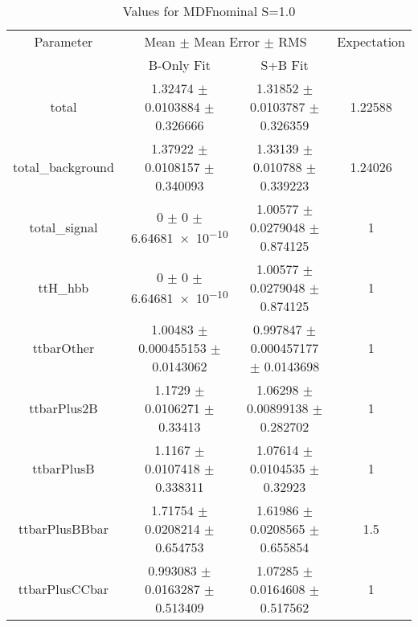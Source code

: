 \begin{table}
\centering
\caption{Values for MDFnominal S=1.0}
\begin{tabular}{cccc}
\toprule
Parameter & \multicolumn{2}{c}{Mean $\pm$ Mean Error $\pm$ RMS} & Expectation\\
 & B-Only Fit & S+B Fit & \\
\midrule
total & \num{1.32474} $\pm$ \num{0.0103884} $\pm$ \num{0.326666} & \num{1.31852} $\pm$ \num{0.0103787} $\pm$ \num{0.326359} & \num{1.22588}\\
total\_background & \num{1.37922} $\pm$ \num{0.0108157} $\pm$ \num{0.340093} & \num{1.33139} $\pm$ \num{0.010788} $\pm$ \num{0.339223} & \num{1.24026}\\
total\_signal & \num{0} $\pm$ \num{0} $\pm$ \num{6.64681e-10} & \num{1.00577} $\pm$ \num{0.0279048} $\pm$ \num{0.874125} & \num{1}\\
ttH\_hbb & \num{0} $\pm$ \num{0} $\pm$ \num{6.64681e-10} & \num{1.00577} $\pm$ \num{0.0279048} $\pm$ \num{0.874125} & \num{1}\\
ttbarOther & \num{1.00483} $\pm$ \num{0.000455153} $\pm$ \num{0.0143062} & \num{0.997847} $\pm$ \num{0.000457177} $\pm$ \num{0.0143698} & \num{1}\\
ttbarPlus2B & \num{1.1729} $\pm$ \num{0.0106271} $\pm$ \num{0.33413} & \num{1.06298} $\pm$ \num{0.00899138} $\pm$ \num{0.282702} & \num{1}\\
ttbarPlusB & \num{1.1167} $\pm$ \num{0.0107418} $\pm$ \num{0.338311} & \num{1.07614} $\pm$ \num{0.0104535} $\pm$ \num{0.32923} & \num{1}\\
ttbarPlusBBbar & \num{1.71754} $\pm$ \num{0.0208214} $\pm$ \num{0.654753} & \num{1.61986} $\pm$ \num{0.0208565} $\pm$ \num{0.655854} & \num{1.5}\\
ttbarPlusCCbar & \num{0.993083} $\pm$ \num{0.0163287} $\pm$ \num{0.513409} & \num{1.07285} $\pm$ \num{0.0164608} $\pm$ \num{0.517562} & \num{1}\\
\bottomrule
\end{tabular}
\end{table}